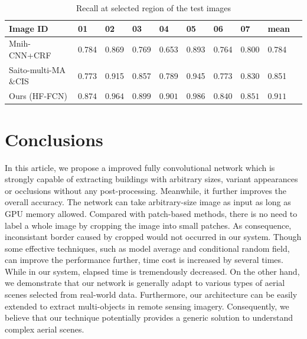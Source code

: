 \documentclass[runningheads]{llncs}
\begin{document}
	\begin{table} 
    \centering
	\caption{Recall at selected region of the test images}
	\begin{tabular}{L{38mm}*{9}{C{9mm}}}     
	\toprule
	Image ID & 01 & 02 & 03 &04 &05 & 06 &07 & mean\\
	\midrule
	Mnih-CNN+CRF \cite{Mnih2013Machine} & 0.784 & 0.869 & 0.769 & 0.653 & 0.893 & 0.764 & 0.800 & 0.784\\
	Saito-multi-MA$\&$CIS  \cite{Saito2016Multiple} & 0.773 & 0.915 & 0.857 & 0.789 & 0.945 & 0.773 &0.830 & 0.851\\
	Ours (HF-FCN) & $\bm{0.874}$ & $\bm{0.964}$  & $\bm{0.899}$ & $\bm{0.901}$ & $\bm{0.986}$ & $\bm{0.840}$ &  $\bm{0.851}$ & $\bm{0.911}$\\
	\bottomrule
	\end{tabular}
	\label{tab:ComparedResultsRecall}
	\end{table} 
 	 

\section{Conclusions}
\label{section:conclusions}
   In  this article, we propose a improved fully convolutional network which is strongly capable of extracting buildings with arbitrary sizes, variant appearances or occlusions without any post-processing. Meanwhile, it further improves the overall accuracy. The network can take arbitrary-size image as input as long as GPU memory allowed. Compared with patch-based methods, there is no need to label a whole image by cropping the image into small patches. As consequence, inconsistant border caused by cropped would not occurred in our system. Though some effective techniques, such as model average and conditional random field, can improve the performance further, 
time cost is increased by several times.  While in our system, elapsed time is tremendously decreased. On the other hand, we demonstrate that our network  is generally adapt to various types of aerial scenes selected from real-world data. Furthermore, our architecture can be easily extended to extract multi-objects in remote sensing imagery. Consequently, we believe that our technique potentially provides a generic solution to understand complex aerial scenes.
	



\end{document}
